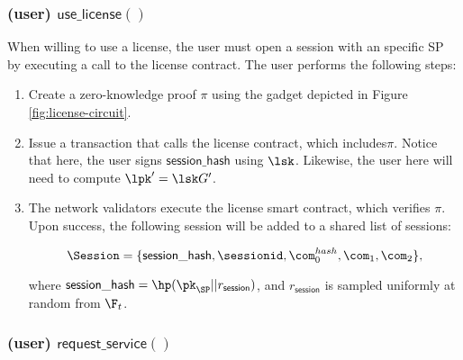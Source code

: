 
\subsubsection{(\textbf{user}) $\mathsf{use\_license()}$}

When willing to use a license, the user must open a session with an specific SP by executing a call to the license contract. The user performs the following steps:


\begin{enumerate}
	\item Create a zero-knowledge proof $\pi$ using the gadget depicted in Figure \ref{fig:license-circuit}.
	
	\item Issue a transaction that calls the license contract, which includes$\pi$. Notice that here, the user signs $\mathsf{session\_hash}$ using $\lsk$. Likewise, the user here will need to compute $\lpk' = \lsk G'$.
	
	\item The network validators execute the license smart contract, which verifies $\pi$. Upon success, the following session will be added to a shared list of sessions:
	
	$$\Session = \{\mathsf{session\_hash}, \sessionid, \com_0^{hash}, \com_1, \com_2\},$$
	
	where $\mathsf{session\_hash} = \hp(\pk_{\SP} || r_\mathsf{session})$, and $r_\mathsf{session}$ is sampled uniformly at random from $\F_t$.
	
\end{enumerate}

\subsubsection{(\textbf{user}) $\mathsf{request\_service()}$}

